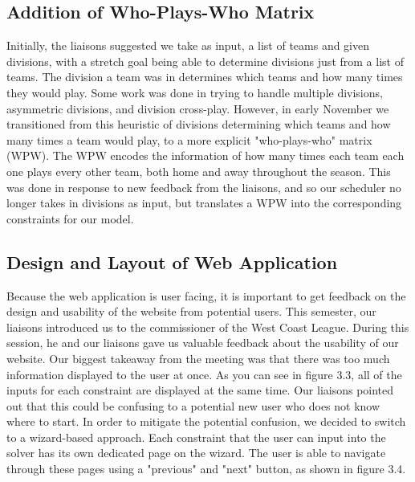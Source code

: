 \documentclass[book]{hmcclinic}
\begin{document}
\subsection{Addition of Who-Plays-Who Matrix}
Initially, the liaisons suggested we take as input, a list of teams and given divisions, with a stretch goal being able to determine divisions just from a list of teams. The division a team was in determines which teams and how many times they would play. Some work was done in trying to handle multiple divisions, asymmetric divisions, and division cross-play. However, in early November we transitioned from this heuristic of divisions determining which teams and how many times a team would play, to a more explicit "who-plays-who" matrix (WPW). The WPW encodes the information of how many times each team each one plays every other team, both home and away throughout the season. This was done in response to new feedback from the liaisons, and so our scheduler no longer takes in divisions as input, but translates a WPW into the corresponding constraints for our model.

\subsection{Design and Layout of Web Application}
Because the web application is user facing, it is important to get feedback on the design and usability of the website from potential users. This semester, our liaisons introduced us to the commissioner of the West Coast League. During this session, he and our liaisons gave us valuable feedback about the usability of our website. Our biggest takeaway from the meeting was that there was too much information displayed to the user at once. As you can see in figure 3.3, all of the inputs for each constraint are displayed at the same time. Our liaisons pointed out that this could be confusing to a potential new user who does not know where to start. In order to mitigate the potential confusion, we decided to switch to a wizard-based approach. Each constraint that the user can input into the solver has its own dedicated page on the wizard. The user is able to navigate through these pages using a "previous" and "next" button, as shown in figure 3.4.
\end{document}
